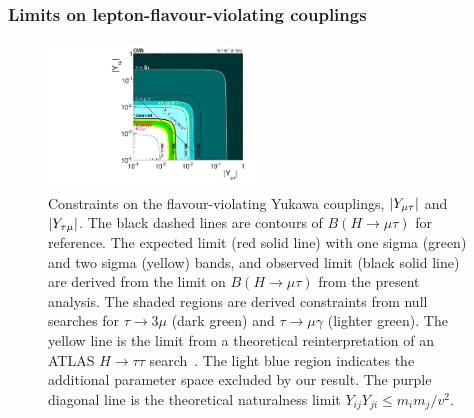 \documentclass[oneside, letterpaper, oldfontcommands]{memoir}
\DeclarePairedDelimiter{\abs}{\lvert}{\rvert}
\begin{document}
{{{ \subsubsection{Limits on lepton-flavour-violating couplings}
\begin{figure}[hbt]\centering
\includegraphics[width=0.49\textwidth]{yukawa.pdf}
 \caption{Constraints on the flavour-violating Yukawa couplings, $\abs{Y_{\mu\tau}}$ and $\abs{Y_{\tau\mu}}$.
The black dashed lines are contours of $B(H \rightarrow \mu \tau )$ for reference.
The expected limit (red solid line) with one sigma (green)  and two sigma (yellow) bands, and observed limit (black solid line) are derived from the limit on $B(H \rightarrow \mu \tau )$ from the present analysis.  The shaded regions are derived constraints from null searches for $\tau \rightarrow 3\mu$ (dark green) and $\tau \rightarrow \mu \gamma$ (lighter green). 
The yellow line is the limit from a theoretical reinterpretation of an ATLAS $H \rightarrow \tau \tau$ search~\cite{Harnik:2012pb}.
The light blue region indicates the additional parameter space excluded by our result.
The purple diagonal line is the theoretical naturalness
limit $Y_{ij}Y_{ji} \leq m_im_j/v^2$. }
 \label{fig:yukawalimits}\end{figure}

}}}
\end{document}
